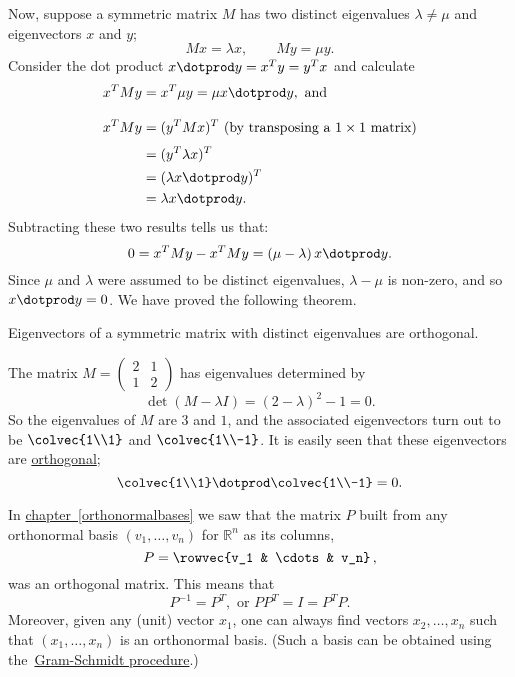 Now, suppose a symmetric matrix $M$ has two distinct eigenvalues $\lambda \neq \mu$ and eigenvectors $x$ and $y$;
\[
Mx=\lambda x, \qquad My=\mu y.
\] 
Consider the dot product $x\dotprod y = x^Ty = y^Tx$ and calculate
\begin{align*}
x^TM y &= x^T\mu y = \mu x\dotprod y, \text{ and }\\[3mm]
x^TM y &= (y^TMx)^T \text{ (by transposing a $1\times 1$ matrix)}\\[1mm]
       &= (y^T\lambda x)^T \\
       &= (\lambda x\dotprod y)^T \\
       &= \lambda x\dotprod y.
\end{align*}
Subtracting these two results tells us that:
\[
0 = x^TMy-x^TMy=(\mu-\lambda)\,x\dotprod y.
\]
Since $\mu$ and $\lambda$ were assumed to be distinct eigenvalues, $\lambda-\mu$ is non-zero, and so $x\dotprod y=0$.  We have proved the following theorem.

\begin{theorem}
Eigenvectors of a symmetric matrix with distinct eigenvalues are orthogonal.
\end{theorem}


\begin{example}
The matrix $M=\begin{pmatrix}2&1\\1&2\end{pmatrix}$
has eigenvalues determined by
\[
\det(M-\lambda I)=(2-\lambda)^2-1=0.
\] 
So the eigenvalues of $M$ are $3$ and $1$, and the associated eigenvectors turn out to be 
$\colvec{1\\1}$ and $\colvec{1\\-1}$.  It is easily seen that these eigenvectors are \hyperref[orthogonal]{orthogonal}; 
\[
\colvec{1\\1} \dotprod \colvec{1\\-1}=0.
\]
\end{example}

In \hyperlink{basisorthog}{chapter~\ref*{orthonormalbases}} we saw that the matrix $P$ built from any orthonormal basis  $(v_1,\ldots, v_n )$
for ${\mathbb R}^n$ as its columns,
\[
P=\rowvec{v_1 & \cdots & v_n}\, ,
\]
was an orthogonal matrix. This means that 
\[
P^{-1}=P^T, \text{ or } PP^T=I=P^TP.
\]
Moreover, given any (unit) vector $x_1$, one can always find vectors $x_2, \ldots, x_n$ such that $(x_1,\ldots, x_n)$ is an orthonormal basis.  (Such a basis can be obtained using the~\hyperref[GramSchmidt]{Gram-Schmidt procedure}.)

